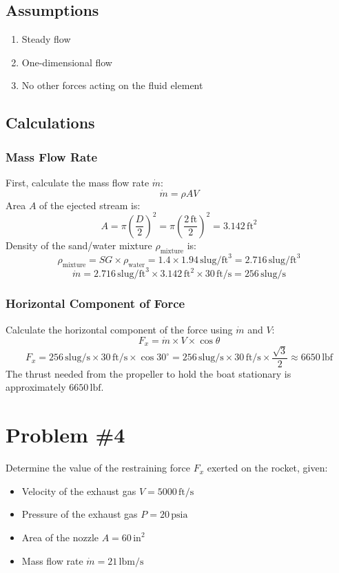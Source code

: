 \documentclass{article}
\begin{document}
\subsection*{Assumptions}
\begin{enumerate}
    \item Steady flow
    \item One-dimensional flow
    \item No other forces acting on the fluid element
\end{enumerate}

\subsection*{Calculations}

\subsubsection*{Mass Flow Rate}
First, calculate the mass flow rate \(\dot{m}\):
\[
\dot{m} = \rho A V
\]
Area \(A\) of the ejected stream is:
\[
A = \pi \left( \frac{D}{2} \right)^2 = \pi \left( \frac{2 \, \text{ft}}{2} \right)^2 = 3.142 \, \text{ft}^2
\]
Density of the sand/water mixture \(\rho_{\text{mixture}}\) is:
\[
\rho_{\text{mixture}} = SG \times \rho_{\text{water}} = 1.4 \times 1.94 \, \text{slug/ft}^3 = 2.716 \, \text{slug/ft}^3
\]
\[
\dot{m} = 2.716 \, \text{slug/ft}^3 \times 3.142 \, \text{ft}^2 \times 30 \, \text{ft/s} = 256 \, \text{slug/s}
\]

\subsubsection*{Horizontal Component of Force}
Calculate the horizontal component of the force using \(\dot{m}\) and \(V\):
\[
F_x = \dot{m} \times V \times \cos \theta
\]
\[
F_x = 256 \, \text{slug/s} \times 30 \, \text{ft/s} \times \cos 30^\circ = 256 \, \text{slug/s} \times 30 \, \text{ft/s} \times \frac{\sqrt{3}}{2} \approx 6650 \, \text{lbf}
\]
The thrust needed from the propeller to hold the boat stationary is approximately \(6650 \, \text{lbf}\).





\newpage
\section*{Problem \#4}
Determine the value of the restraining force \( F_x \) exerted on the rocket, given:
\begin{itemize}
    \item Velocity of the exhaust gas \(V = 5000 \, \text{ft/s}\)
    \item Pressure of the exhaust gas \(P = 20 \, \text{psia}\)
    \item Area of the nozzle \(A = 60 \, \text{in}^2\)
    \item Mass flow rate \(\dot{m} = 21 \, \text{lbm/s}\)
\end{itemize}
\end{document}
